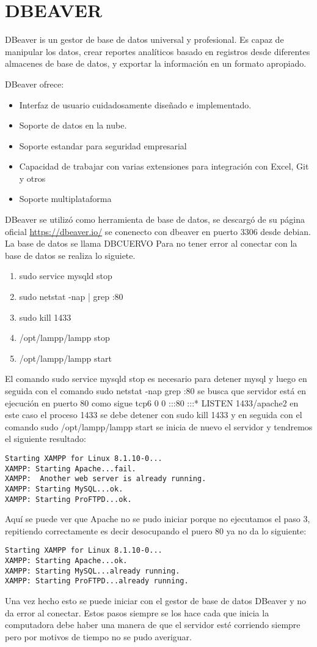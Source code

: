 \chapter{DBEAVER}
DBeaver is un gestor de base de datos universal y profesional. Es capaz de manipular los datos, crear reportes analíticos basado en registros desde diferentes almacenes de base de datos, y exportar la información en un formato apropiado. 

DBeaver ofrece:
\begin{itemize}
\item Interfaz de usuario cuidadosamente diseñado e implementado.
\item Soporte de datos en la nube.
\item Soporte estandar para seguridad empresarial
\item Capacidad de trabajar con varias extensiones para integración con Excel, Git y otros
\item Soporte multiplataforma
\end{itemize}

DBeaver se utilizó como herramienta de base de datos, se descargó de su página oficial \url{https://dbeaver.io/}
se conenecto con dbeaver en puerto 3306 desde debian. La base de datos se llama DBCUERVO
Para no tener error al conectar con la base de datos se realiza lo siguiete. 
\begin{enumerate}
\item sudo service mysqld stop
\item sudo netstat -nap | grep :80 
\item sudo kill 1433
\item /opt/lampp/lampp stop
\item /opt/lampp/lampp start
\end{enumerate}
El comando sudo service mysqld stop es necesario para detener mysql y luego en seguida con el comando  sudo netstat -nap  grep :80 se busca que servidor está en ejecución en puerto 80 como sigue tcp6       0      0 :::80                   :::*                    LISTEN      1433/apache2    en este caso el proceso 1433 se debe detener con sudo kill 1433
y en seguida con el comando sudo /opt/lampp/lampp start se inicia de nuevo el servidor y tendremos el siguiente resultado:
\begin{verbatim}
Starting XAMPP for Linux 8.1.10-0...
XAMPP: Starting Apache...fail.
XAMPP:  Another web server is already running.
XAMPP: Starting MySQL...ok.
XAMPP: Starting ProFTPD...ok.
\end{verbatim}
Aquí se puede ver que Apache no se pudo iniciar porque no ejecutamos el paso 3, repitiendo correctamente es decir desocupando el puero 80 ya no da lo siguiente:
\begin{verbatim}
Starting XAMPP for Linux 8.1.10-0...
XAMPP: Starting Apache...ok.
XAMPP: Starting MySQL...already running.
XAMPP: Starting ProFTPD...already running.
\end{verbatim}
Una vez hecho esto se puede iniciar con el gestor de base de datos DBeaver y no da error al conectar. Estos pasos siempre se los hace cada que inicia la computadora debe haber una manera de que el servidor esté corriendo siempre pero por motivos de tiempo no se pudo averiguar. 